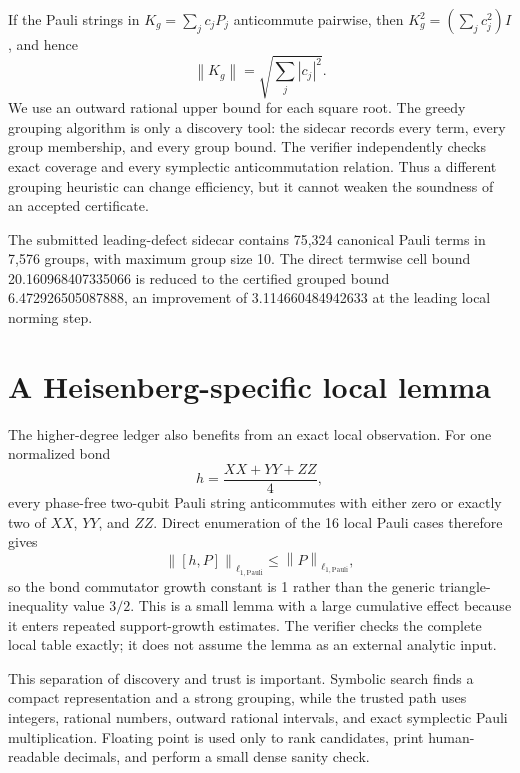 \documentclass[11pt]{article}
\newcommand{\opnorm}[1]{\left\lVert #1\right\rVert}
\newcommand{\PauliLOne}{\ell_{1,\mathrm{Pauli}}}
\begin{document}
If the Pauli strings in $K_g=\sum_j c_jP_j$ anticommute pairwise, then
$K_g^2=(\sum_jc_j^2)I$, and hence
\begin{equation}
  \opnorm{K_g}=\sqrt{\sum_j |c_j|^2}.
  \label{eq:anticommute}
\end{equation}
We use an outward rational upper bound for each square root.  The greedy
grouping algorithm is only a discovery tool: the sidecar records every term,
every group membership, and every group bound.  The verifier independently
checks exact coverage and every symplectic anticommutation relation.  Thus a
different grouping heuristic can change efficiency, but it cannot weaken the
soundness of an accepted certificate.

The submitted leading-defect sidecar contains 75,324 canonical Pauli terms in
7,576 groups, with maximum group size 10.  The direct termwise cell bound
20.160968407335066 is reduced to the certified grouped bound
6.472926505087888, an improvement of 3.114660484942633 at the leading local
norming step.

\section{A Heisenberg-specific local lemma}

The higher-degree ledger also benefits from an exact local observation.  For
one normalized bond
\begin{equation}
  h=\frac{XX+YY+ZZ}{4},
\end{equation}
every phase-free two-qubit Pauli string anticommutes with either zero or
exactly two of $XX$, $YY$, and $ZZ$.  Direct enumeration of the 16 local
Pauli cases therefore gives
\begin{equation}
  \opnorm{[h,P]}_{\PauliLOne}
  \le \opnorm{P}_{\PauliLOne},
  \label{eq:locallemma}
\end{equation}
so the bond commutator growth constant is 1 rather than the generic
triangle-inequality value $3/2$.  This is a small lemma with a large cumulative
effect because it enters repeated support-growth estimates.  The verifier
checks the complete local table exactly; it does not assume the lemma as an
external analytic input.

This separation of discovery and trust is important.  Symbolic search finds a
compact representation and a strong grouping, while the trusted path uses
integers, rational numbers, outward rational intervals, and exact symplectic
Pauli multiplication.  Floating point is used only to rank candidates, print
human-readable decimals, and perform a small dense sanity check.
\end{document}
